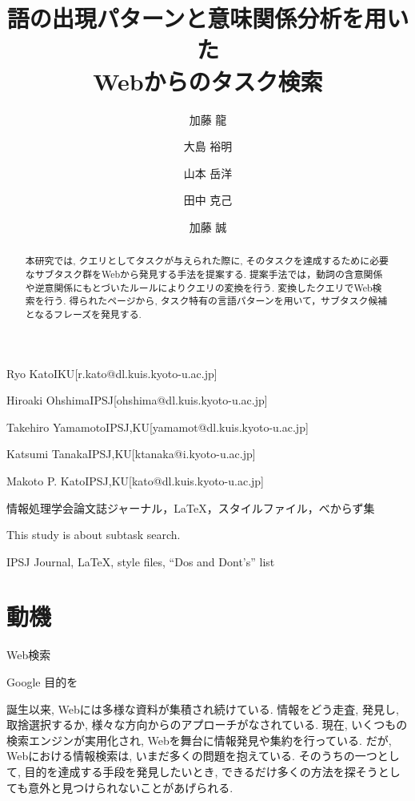 \documentclass[submit,techreq]{ipsj}
\begin{document}
\title{語の出現パターンと意味関係分析を用いた\\
Webからのタスク検索}







\author{加藤 龍}{Ryo Kato}{IKU}[r.kato@dl.kuis.kyoto-u.ac.jp]
\author{大島 裕明}{Hiroaki Ohshima}{IPSJ}[ohshima@dl.kuis.kyoto-u.ac.jp]
\author{山本 岳洋}{Takehiro Yamamoto}{IPSJ,KU}[yamamot@dl.kuis.kyoto-u.ac.jp]
\author{田中 克己}{Katsumi Tanaka}{IPSJ,KU}[ktanaka@i.kyoto-u.ac.jp]
\author{加藤 誠}{Makoto P. Kato}{IPSJ,KU}[kato@dl.kuis.kyoto-u.ac.jp]

\begin{abstract}
本研究では, クエリとしてタスクが与えられた際に, そのタスクを達成するために必要なサブタスク群をWebから発見する手法を提案する. 提案手法では，動詞の含意関係や逆意関係にもとづいたルールによりクエリの変換を行う. 変換したクエリでWeb検索を行う. 得られたページから, タスク特有の言語パターンを用いて，サブタスク候補となるフレーズを発見する. 
\end{abstract}

\begin{jkeyword}
情報処理学会論文誌ジャーナル，\LaTeX，スタイルファイル，べからず集
\end{jkeyword}

\begin{eabstract}
This study is about subtask search.
\end{eabstract}

\begin{ekeyword}
IPSJ Journal, \LaTeX, style files, ``Dos and Dont's'' list
\end{ekeyword}

\maketitle

\section{動機}

Web検索

Google
目的を

誕生以来, Webには多様な資料が集積され続けている. 情報をどう走査, 発見し, 取捨選択するか, 様々な方向からのアプローチがなされている. 
現在, いくつもの検索エンジンが実用化され, Webを舞台に情報発見や集約を行っている. だが, Webにおける情報検索は, いまだ多くの問題を抱えている. 
そのうちの一つとして, 目的を達成する手段を発見したいとき, できるだけ多くの方法を探そうとしても意外と見つけられないことがあげられる.
\end{document}
